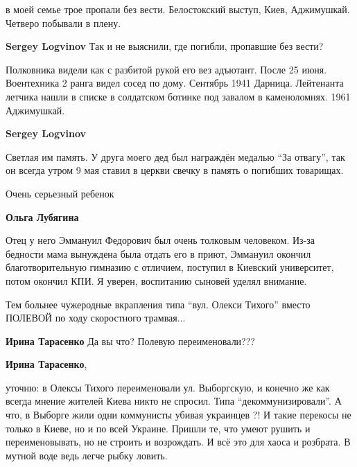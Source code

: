 \begin{itemize}
\begin{itemize}
\begin{itemize}
в моей семье трое пропали без вести. Белостокский выступ, Киев, Аджимушкай.
Четверо побывали в плену.

\textbf{Sergey Logvinov} Так и не выяснили, где погибли, пропавшие без вести?
\end{itemize} %


Полковника видели как с разбитой рукой его вез адъютант. После 25 июня.
Воентехника 2 ранга видел сосед по дому. Сентябрь 1941 Дарница. Лейтенанта
летчика нашли в списке в солдатском ботинке под завалом в каменоломнях. 1961
Аджимушкай.

\textbf{Sergey Logvinov} 

Светлая им память. У друга моего дед был награждён медалью \enquote{За отвагу}, так он
всегда утром 9 мая ставил в церкви свечку в память о погибших товарищах.

\end{itemize} %

Очень серьезный ребенок

\begin{itemize} %
\textbf{Ольга Лубягина} 

Отец у него Эммануил Федорович был очень толковым человеком. Из-за бедности
мама вынуждена была отдать его в приют, Эммануил окончил благотворительную
гимназию с отличием, поступил в Киевский университет, потом окончил КПИ. Я
уверен, воспитанию сыновей уделял внимание.

\end{itemize} %


Тем больнее чужеродные вкрапления типа \enquote{вул. Олекси Тихого} вместо
ПОЛЕВОЙ по ходу скоростного трамвая...

\begin{itemize} %
\textbf{Ирина Тарасенко} Да вы что? Полевую переименовали???

\textbf{Ирина Тарасенко}, 

уточню: в Олексы Тихого переименовали ул. Выборгскую, и конечно же как всегда
мнение жителей Киева никто не спросил. Типа \enquote{декоммунизировали}. А что, в
Выборге жили одни коммунисты убивая украинцев ?! И такие перекосы не только в
Киеве, но и по всей Украине. Пришли те, что умеют рушить и переименовывать, но
не строить и возрождать. И всё это для хаоса и розбрата. В мутной воде ведь
легче рыбку ловить.


\end{itemize}
\end{itemize}
